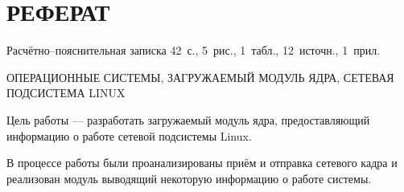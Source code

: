 \chapter*{РЕФЕРАТ}

Расчётно--пояснительная записка 42~с., 5~рис., 1~табл., 12~источн., 1~прил.

\noindent\MakeUppercase{операционные системы, загружаемый модуль ядра, сетевая подсистема Linux}

Цель работы --- разработать загружаемый модуль ядра, предоставляющий информацию о работе сетевой подсистемы Linux.

В процессе работы были проанализированы приём и отправка сетевого кадра и реализован модуль выводящий некоторую информацию о работе системы.

\setcounter{page}{3}